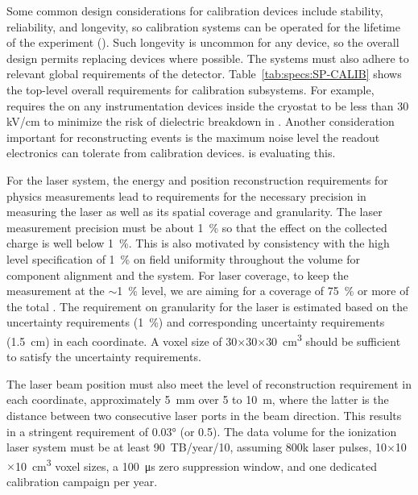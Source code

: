 Some common design considerations for calibration devices include stability, reliability, and longevity, so calibration systems can be operated for the lifetime of the experiment (\dunelifetime). Such longevity is uncommon for any device, so the overall design permits replacing devices where possible. The systems must also adhere to relevant global requirements of the  detector. Table~\ref{tab:specs:SP-CALIB} shows the top-level overall requirements for calibration subsystems. For example,  requires the \efield  on any instrumentation devices inside the cryostat to be less than 30 kV/cm to minimize the risk of dielectric breakdown in . Another consideration important for reconstructing events is the maximum noise level the readout electronics can tolerate from calibration devices.  is evaluating this. 

 For the laser system, the energy and position reconstruction requirements for physics measurements lead to requirements for the necessary precision in measuring the laser \efield as well as its spatial coverage and granularity. The laser \efield measurement precision must be about \SI{1}{\%} so that the effect on the collected charge is well below \SI{1}{\%}. This is also motivated by consistency with the high level  specification of \SI{1}{\%} on field uniformity throughout the volume for component alignment and the  system. For laser coverage, to keep the \efield measurement at the $\sim$\SI{1}{\%} level, we are aiming for a coverage of \SI{75}{\%} or more of the total . The requirement on granularity for the laser is estimated based on the  uncertainty requirements (\SI{1}{\%}) and corresponding uncertainty requirements (\SI{1.5}{\cm}) in each coordinate. A voxel size of \num{30}$\times$\num{30}$\times$\SI{30}{\cubic\cm} should be sufficient to satisfy the  uncertainty requirements. 

The laser beam position must also meet the level of reconstruction requirement in each coordinate, approximately \SI{5}{\milli\m} over \num{5} to \SI{10}{\m}, where the latter is the distance between two consecutive laser ports in the beam direction. This results in a stringent requirement of \ang{0.03} (or \SI{0.5}{\mrad}). The data volume for the ionization laser system must be at least \num{90}~TB/year/\SI{10}{\kt}, assuming \num{800}k laser pulses, \num{10}$\times$\num{10}$\times$\SI{10}{\cubic\cm} voxel sizes, a \SI{100}{\micro\s} zero suppression window, and one dedicated calibration campaign per year.

